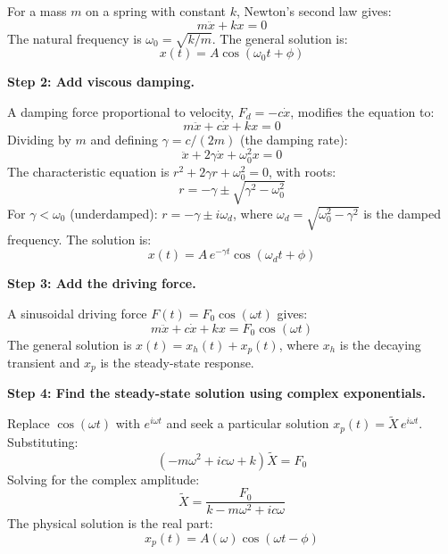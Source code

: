 \documentclass[11pt,openright]{book}
\begin{document}
For a mass $m$ on a spring with constant $k$, Newton's second law gives:
\begin{equation}
m\ddot{x} + kx = 0
\end{equation}
The natural frequency is $\omega_0 = \sqrt{k/m}$. The general solution is:
\begin{equation}
x(t) = A\cos(\omega_0 t + \phi)
\end{equation}

\textbf{Step 2: Add viscous damping.}

A damping force proportional to velocity, $F_d = -c\dot{x}$, modifies the equation to:
\begin{equation}
m\ddot{x} + c\dot{x} + kx = 0
\end{equation}
Dividing by $m$ and defining $\gamma = c/(2m)$ (the damping rate):
\begin{equation}
\ddot{x} + 2\gamma\dot{x} + \omega_0^2 x = 0
\end{equation}
The characteristic equation is $r^2 + 2\gamma r + \omega_0^2 = 0$, with roots:
\begin{equation}
r = -\gamma \pm \sqrt{\gamma^2 - \omega_0^2}
\end{equation}
For $\gamma < \omega_0$ (underdamped): $r = -\gamma \pm i\omega_d$, where $\omega_d = \sqrt{\omega_0^2 - \gamma^2}$ is the damped frequency. The solution is:
\begin{equation}
x(t) = A\,e^{-\gamma t}\cos(\omega_d t + \phi)
\end{equation}

\textbf{Step 3: Add the driving force.}

A sinusoidal driving force $F(t) = F_0\cos(\omega t)$ gives:
\begin{equation}
m\ddot{x} + c\dot{x} + kx = F_0\cos(\omega t)
\end{equation}
The general solution is $x(t) = x_h(t) + x_p(t)$, where $x_h$ is the decaying transient and $x_p$ is the steady-state response.

\textbf{Step 4: Find the steady-state solution using complex exponentials.}

Replace $\cos(\omega t)$ with $e^{i\omega t}$ and seek a particular solution $x_p(t) = \tilde{X}\,e^{i\omega t}$. Substituting:
\begin{equation}
(-m\omega^2 + ic\omega + k)\tilde{X} = F_0
\end{equation}
Solving for the complex amplitude:
\begin{equation}
\tilde{X} = \frac{F_0}{k - m\omega^2 + ic\omega}
\end{equation}
The physical solution is the real part:
\begin{equation}
x_p(t) = A(\omega)\cos(\omega t - \phi)
\end{equation}
\end{document}
